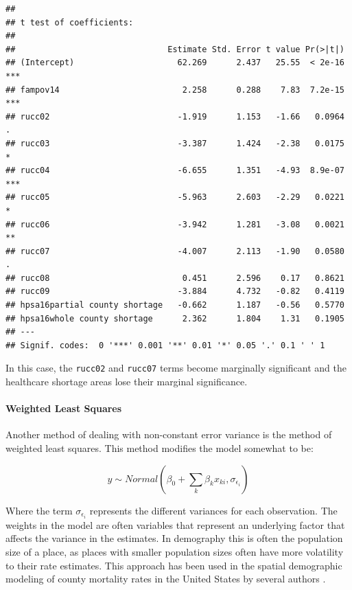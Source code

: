 \documentclass[
]{article}
\begin{document}
\begin{verbatim}
## 
## t test of coefficients:
## 
##                               Estimate Std. Error t value Pr(>|t|)    
## (Intercept)                     62.269      2.437   25.55  < 2e-16 ***
## fampov14                         2.258      0.288    7.83  7.2e-15 ***
## rucc02                          -1.919      1.153   -1.66   0.0964 .  
## rucc03                          -3.387      1.424   -2.38   0.0175 *  
## rucc04                          -6.655      1.351   -4.93  8.9e-07 ***
## rucc05                          -5.963      2.603   -2.29   0.0221 *  
## rucc06                          -3.942      1.281   -3.08   0.0021 ** 
## rucc07                          -4.007      2.113   -1.90   0.0580 .  
## rucc08                           0.451      2.596    0.17   0.8621    
## rucc09                          -3.884      4.732   -0.82   0.4119    
## hpsa16partial county shortage   -0.662      1.187   -0.56   0.5770    
## hpsa16whole county shortage      2.362      1.804    1.31   0.1905    
## ---
## Signif. codes:  0 '***' 0.001 '**' 0.01 '*' 0.05 '.' 0.1 ' ' 1
\end{verbatim}

In this case, the \texttt{rucc02} and \texttt{rucc07} terms become marginally significant and the healthcare shortage areas lose their marginal significance.

\hypertarget{weighted-least-squares}{%
\paragraph{Weighted Least Squares}\label{weighted-least-squares}}

Another method of dealing with non-constant error variance is the method of weighted least squares. This method modifies the model somewhat to be:

\[y \sim Normal(\beta_0 +\sum_k \beta_k x_{ki}, \sigma_{\epsilon_i} )\]

Where the term \(\sigma_{\epsilon_i}\) represents the different variances for each observation. The weights in the model are often variables that represent an underlying factor that affects the variance in the estimates. In demography this is often the population size of a place, as places with smaller population sizes often have more volatility to their rate estimates. This approach has been used in the spatial demographic modeling of county mortality rates in the United States by several authors \citep{mclaughlin_differential_2007, sparks_application_2010}.
\end{document}
